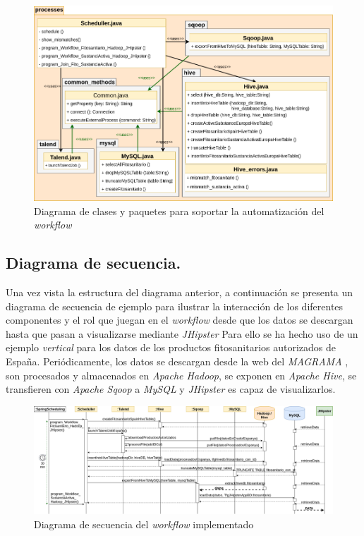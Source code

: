 \begin{figure}[H]
    \centering
    \includegraphics[width=\textwidth,height=\textheight,keepaspectratio]{Imagenes/clases}
    \caption{Diagrama de clases y paquetes para soportar la automatización del \textit{workflow}}
    \label{fig:diag_clases}
\end{figure}

\subsection{Diagrama de secuencia.} \label{disenyo.arquitectura.secuencia}
\par Una vez vista la estructura del diagrama anterior, a continuación se presenta un diagrama de secuencia de ejemplo para ilustrar la interacción de los diferentes componentes y el rol que juegan en el \textit{workflow} desde que los datos se descargan hasta que pasan a visualizarse mediante \textit{JHipster} Para ello se ha hecho uso de un ejemplo \textit{vertical} para los datos de los productos fitosanitarios autorizados de España. Periódicamente, los datos se descargan desde la web del \textit{MAGRAMA} \cite{mapama}, son procesados y almacenados en \textit{Apache Hadoop}, se exponen en \textit{Apache Hive}, se transfieren con \textit{Apache Sqoop} a \textit{MySQL} y \textit{JHipster} es capaz de visualizarlos.

\begin{landscape}
\begin{figure}[p!]
    \includegraphics[width=\linewidth]{Imagenes/secuencia}
    \caption{Diagrama de secuencia del \textit{workflow} implementado}
    \label{fig:diag_secuencia_workflow}
\end{figure}
\end{landscape}
\bigskip


